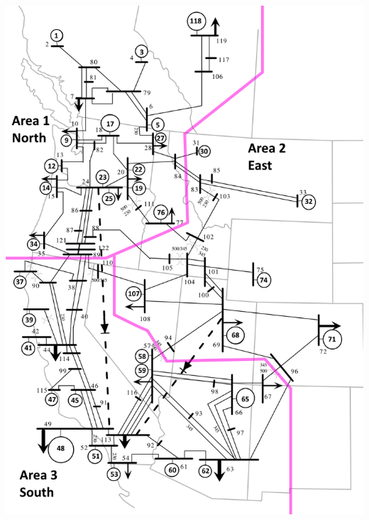 \documentclass[12pt]{article}
\begin{document}
\begin{minipage}{0.47\linewidth}
\includegraphics[width=\linewidth]{miniWECC_split03.png}
\end{minipage}%
\end{document}
